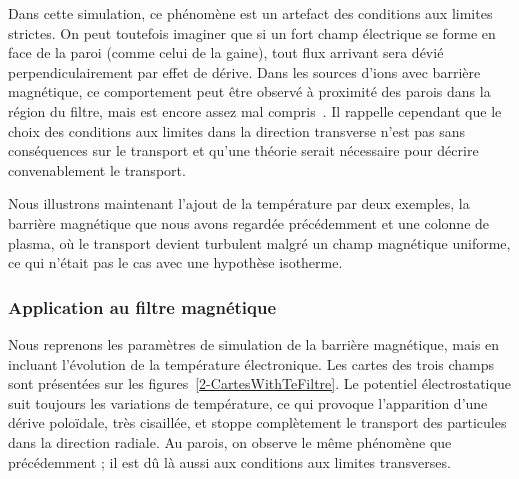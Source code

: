 \begin{refsection}
Dans cette simulation, ce phénomène est un artefact des
conditions aux limites strictes. On peut toutefois imaginer que si un fort
champ électrique se forme en face de la paroi (comme celui de la gaine), tout
flux arrivant sera dévié perpendiculairement par effet de dérive.
Dans les sources d'ions avec barrière magnétique, ce comportement peut être
observé à proximité des parois dans la région du filtre, mais est encore assez
mal compris~\parencite{PIC2D,PIC3D,Kolev}.
Il rappelle cependant que le choix des conditions aux limites dans la direction
transverse n'est pas sans conséquences sur le transport et qu'une théorie
serait nécessaire pour décrire convenablement le transport.

Nous illustrons maintenant l'ajout de la température par deux exemples, la
barrière magnétique que nous avons regardée précédemment et une colonne de
plasma, où le transport devient turbulent malgré un champ magnétique uniforme, ce qui
n'était pas le cas avec une hypothèse isotherme.

	\subsubsection{Application au filtre magnétique}

Nous reprenons les paramètres de simulation de la barrière magnétique, mais en
incluant l'évolution de la température électronique. Les cartes des trois champs
sont présentées sur les figures~\ref{2-CartesWithTeFiltre}. Le
potentiel électrostatique suit toujours les variations de température, ce qui
provoque l'apparition d'une dérive poloïdale, très cisaillée, et stoppe complètement le
transport des particules dans la direction radiale. Au parois, on observe le
même phénomène que précédemment ; il est dû là aussi aux conditions aux limites
transverses.


\end{refsection}
